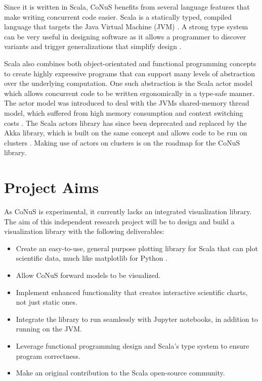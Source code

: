 \documentclass[12pt]{article}
\begin{document}
Since it is written in Scala, CoNuS benefits from several language features that make writing concurrent code easier. Scala is a statically typed, compiled language that targets the Java Virtual Machine (JVM) \autocite{scala}. A strong type system can be very useful in designing software as it allows a programmer to discover variants and trigger generalizations that simplify design \autocite{LAMMEL20081}. 

Scala also combines both object-orientated and functional programming concepts to create highly expressive programs that can support many levels of abstraction over the underlying computation. One such abstraction is the Scala actor model which allows concurrent code to be written ergonomically in a type-safe manner. The actor model was introduced to deal with the JVMs shared-memory thread model, which suffered from high memory consumption and context switching costs \autocite{haller_odersky_2009}. The Scala actors library has since been deprecated and replaced by the Akka library, which is built on the same concept and allows code to be run on clusters \autocite{akka}. Making use of actors on clusters is on the roadmap for the CoNuS library.

\section{Project Aims}
As CoNuS is experimental, it currently lacks an integrated visualization library. The aim of this independent research project will be to design and build a visualization library with the following deliverables:

\begin{itemize}
\item Create an easy-to-use, general purpose plotting library for Scala that can plot scientific data, much like matplotlib for Python \autocite{matplotlib}.
\item Allow CoNuS forward models to be visualized.
\item Implement enhanced functionality that creates interactive scientific charts, not just static ones. 
\item Integrate the library to run seamlessly with Jupyter notebooks, in addition to running on the JVM.
\item Leverage functional programming design and Scala's type system to ensure program correctness.
\item Make an original contribution to the Scala open-source community.
\end{itemize}
\end{document}
